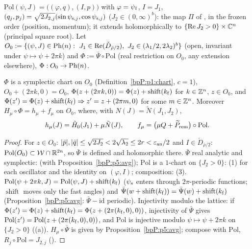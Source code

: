 \begin{definition}\label{bpP:p5:phi}
$\mathrm{Pol}(\psi,J)=\bigl((\varphi,q),(I,p)\bigr)$ with $\varphi=\psi_{\rm f}$, $I=J_1$, $(q_j,p_j)=\sqrt{2J_{2,j}}(\sin\psi_{{\rm s},j},\cos\psi_{{\rm s},j})$ ($J_2\in(0,\infty)^b$): the map $\Pi$ of , in the frozen order (position, momentum); it extends holomorphically to $\{\operatorname{Re}J_2>0\}\times\mathbb{C}^n$ (principal square root). Let $O_0:=\{(\psi,J)\in\Ph n:\ J_1\in\operatorname{Re}(\check D_{\bar\rho/2}),\ J_2\in(\lambda_1/2,2\lambda_2)^b\}$ (open, invariant under $\psi\mapsto\psi+2\pi k$) and $\Phi:=\bar\Psi\circ\mathrm{Pol}$ (real restriction on $O_0$, any extension elsewhere), $\Phi:O_0\to\mathrm{Ph}(n)$.
\end{definition}

\begin{lemma}\label{bpP:p5:phi-chart}
$\Phi$ is a symplectic chart on $O_0$ (Definition~\ref{bpP:p1:chart}, $c=1$), $O_0+(2\pi k,0)=O_0$, $\Phi(z+(2\pi k,0))=\Phi(z)+\operatorname{shift}(k_{\rm f})$ for $k\in\mathbb{Z}^n$, $z\in O_0$, and $\Phi(z')=\Phi(z)+\operatorname{shift}(k_{\rm f})\Rightarrow z'=z+(2\pi m,0)$ for some $m\in\mathbb{Z}^n$. Moreover $H_\mu\circ\Phi=h_\mu+f_\mu$ on $O_0$, where, with $N(J)=\tilde N(J_1,J_2)$,
\[h_\mu(J)=\tilde H_0(J_1)+\mu\tilde N(J),\qquad f_\mu=\bigl(\mu Q+\widetilde P_{\rm rem}\bigr)\circ\mathrm{Pol}.\]
\end{lemma}
\begin{proof}
\label{stepP:p5:pc-img} For $z\in O_0$: $\lvert \bar p\rvert,\lvert \bar q\rvert\le\sqrt{2J_2}<2\sqrt{\lambda_2}\le2r<\varepsilon_{\rm an}/2$ and $I\in\check D_{\bar\rho/2}$: $\mathrm{Pol}(O_0)\subset\mathcal W\cap\mathbb{R}^{2n}$, so $\bar\Psi$ is defined and holomorphic there. $\bar\Psi$ real analytic and symplectic:  (with Proposition~\ref{bpP:p5:avg}); $\mathrm{Pol}$ is a $1$-chart on $\{J_2>0\}$: (1) for each oscillator and the identity on $(\varphi,I)$; composition: (3).
\label{stepP:p5:pc-lat} $\mathrm{Pol}(\psi+2\pi k,J)=\mathrm{Pol}(\psi,J)+\operatorname{shift}(k_{\rm f})$ ($\psi_{\rm s}$ enters through $2\pi$-periodic functions; $\operatorname{shift}$ moves only the fast angles) and $\bar\Psi(w+\operatorname{shift}(k_{\rm f}))=\bar\Psi(w)+\operatorname{shift}(k_{\rm f})$ (Proposition~\ref{bpP:p5:avg}: $\bar\Psi-\mathrm{id}$ periodic). Injectivity modulo the lattice: if $\Phi(z')=\Phi(z)+\operatorname{shift}(k_{\rm f})=\Phi(z+(2\pi(k_{\rm f},0),0))$, injectivity of $\bar\Psi$ gives $\mathrm{Pol}(z')=\mathrm{Pol}(z+(2\pi(k_{\rm f},0),0))$, and $\mathrm{Pol}$ is injective modulo $\psi\mapsto\psi+2\pi k$ on $\{J_2>0\}$ ((a)).
\label{stepP:p5:pc-ham} $H_\mu\circ\bar\Psi$ is given by Proposition~\ref{bpP:p5:avg}; compose with $\mathrm{Pol}$, $R_j\circ\mathrm{Pol}=J_{2,j}$ ().
\end{proof}

